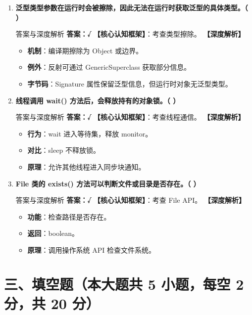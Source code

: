 \documentclass[12pt, a4paper]{ctexart}
\begin{document}
\begin{enumerate}[label=\arabic*.]
\item \textbf{泛型类型参数在运行时会被擦除，因此无法在运行时获取泛型的具体类型。（ \quad ）}
\begin{bluebox}{答案与深度解析}
\textbf{答案：√}
\textbf{【核心认知框架】}：考查类型擦除。
\textbf{【深度解析】}
\begin{itemize}[leftmargin=*, nosep]
    \item \textbf{机制}：编译期擦除为 Object 或边界。
    \item \textbf{例外}：反射可通过 GenericSuperclass 获取部分信息。
    \item \textbf{字节码}：Signature 属性保留泛型信息，但运行时对象无泛型类型。
\end{itemize}
\end{bluebox}

\item \textbf{线程调用 wait() 方法后，会释放持有的对象锁。（ \quad ）}
\begin{bluebox}{答案与深度解析}
\textbf{答案：√}
\textbf{【核心认知框架】}：考查线程通信。
\textbf{【深度解析】}
\begin{itemize}[leftmargin=*, nosep]
    \item \textbf{行为}：wait 进入等待集，释放 monitor。
    \item \textbf{对比}：sleep 不释放锁。
    \item \textbf{原理}：允许其他线程进入同步块通知。
\end{itemize}
\end{bluebox}

\item \textbf{File 类的 exists() 方法可以判断文件或目录是否存在。（ \quad ）}
\begin{bluebox}{答案与深度解析}
\textbf{答案：√}
\textbf{【核心认知框架】}：考查 File API。
\textbf{【深度解析】}
\begin{itemize}[leftmargin=*, nosep]
    \item \textbf{功能}：检查路径是否存在。
    \item \textbf{返回}：boolean。
    \item \textbf{原理}：调用操作系统 API 检查文件系统。
\end{itemize}
\end{bluebox}
\end{enumerate}

\section*{三、填空题（本大题共 5 小题，每空 2 分，共 20 分）}
\end{document}
